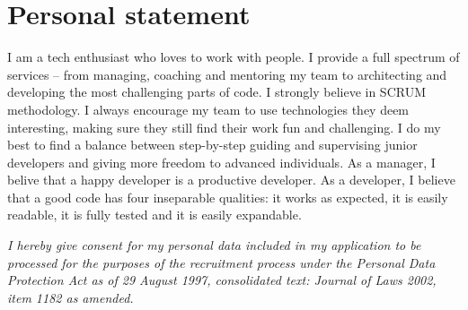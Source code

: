 \documentclass[letterpaper]{twentysecondcv} %
\begin{document}

\section{Personal statement}

I am a tech enthusiast who loves to work with people. I provide a full spectrum of services -- from managing, coaching and mentoring my team to architecting and developing the most challenging parts of code. I strongly believe in SCRUM methodology. I always encourage my team to use technologies they deem interesting, making sure they still find their work fun and challenging. I do my best to find a balance between step-by-step guiding and supervising junior developers and giving more freedom to advanced individuals. As a manager, I belive that a happy developer is a productive developer. As a developer, I believe that a good code has four inseparable qualities: it works as expected, it is easily readable, it is fully tested and it is easily expandable.

\pagebreak
{}
\setlength{\parindent}{15pt} 

\par \large \textit{I hereby give consent for my personal data included in my application to be processed for the purposes of the recruitment process under the Personal Data Protection Act as of 29 August 1997, consolidated text: Journal of Laws 2002, item 1182 as amended.}
\end{document}

